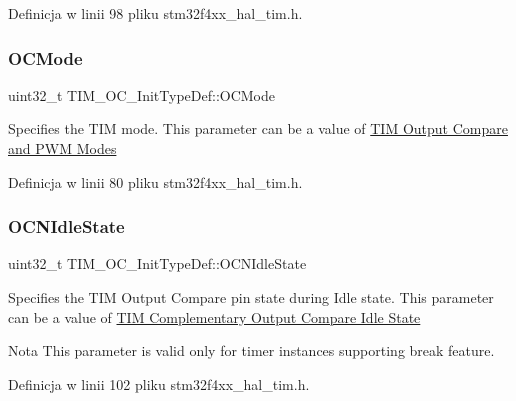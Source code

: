 Definicja w linii 98 pliku stm32f4xx\+\_\+hal\+\_\+tim.\+h.

\mbox{\label{struct_t_i_m___o_c___init_type_def_ae5faa1cba0b3f1ab6179cc54e1015ee8}} 
\subsubsection{\texorpdfstring{O\+C\+Mode}{OCMode}}
{\footnotesize\ttfamily uint32\+\_\+t T\+I\+M\+\_\+\+O\+C\+\_\+\+Init\+Type\+Def\+::\+O\+C\+Mode}

Specifies the T\+IM mode. This parameter can be a value of \hyperlink{group___t_i_m___output___compare__and___p_w_m__modes}{T\+IM Output Compare and P\+WM Modes} 

Definicja w linii 80 pliku stm32f4xx\+\_\+hal\+\_\+tim.\+h.

\mbox{\label{struct_t_i_m___o_c___init_type_def_a0d70cc51990d7433fd76cc6ed1d06237}} 
\subsubsection{\texorpdfstring{O\+C\+N\+Idle\+State}{OCNIdleState}}
{\footnotesize\ttfamily uint32\+\_\+t T\+I\+M\+\_\+\+O\+C\+\_\+\+Init\+Type\+Def\+::\+O\+C\+N\+Idle\+State}

Specifies the T\+IM Output Compare pin state during Idle state. This parameter can be a value of \hyperlink{group___t_i_m___output___compare___n___idle___state}{T\+IM Complementary Output Compare Idle State} \begin{DoxyNote}{Nota}
This parameter is valid only for timer instances supporting break feature. 
\end{DoxyNote}


Definicja w linii 102 pliku stm32f4xx\+\_\+hal\+\_\+tim.\+h.

\mbox{\label{struct_t_i_m___o_c___init_type_def_a21922d8e2fee659d081c4be4c500d1d4}} 

